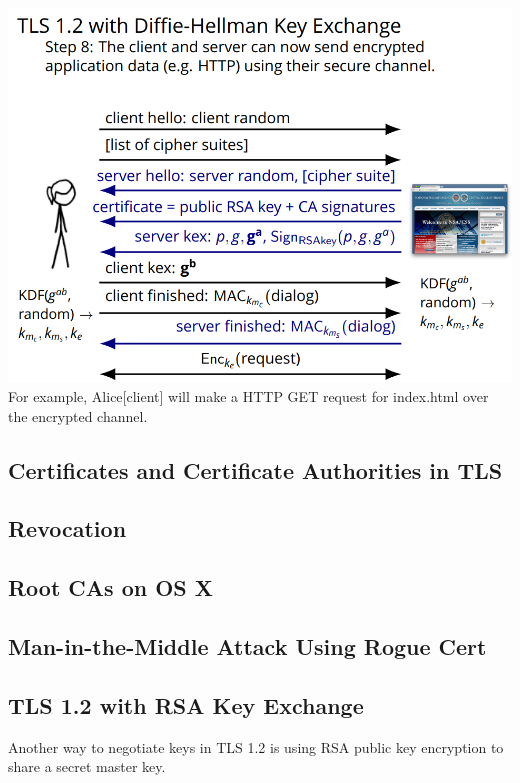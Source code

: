 \documentclass[11pt]{article} %
\begin{document}
{\includegraphics[scale=1.2]{./DiffieStep8.png}
\\

For example, Alice[client] will make a HTTP GET request for index.html over 
the encrypted channel.

\newpage
\subsection{Certificates and Certificate Authorities in TLS}

\subsection{Revocation}

\subsection{Root CAs on OS X}

\subsection{Man-in-the-Middle Attack Using Rogue Cert}

\newpage
\subsection{TLS 1.2 with RSA Key Exchange}
Another way to negotiate keys in TLS 1.2 is using RSA public key encryption to 
share a secret master key.

}
\end{document}
